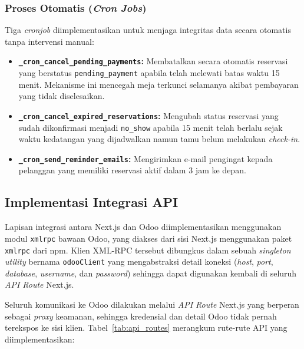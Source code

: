 \documentclass[conference]{IEEEtran}
\begin{document}
\subsubsection{Proses Otomatis (\textit{Cron Jobs})}
Tiga \textit{cronjob} diimplementasikan untuk menjaga integritas data secara otomatis tanpa intervensi manual:
\begin{itemize}
    \item \textbf{\texttt{\_cron\_cancel\_pending\_payments}:} Membatalkan secara otomatis reservasi yang berstatus \texttt{pending\_payment} apabila telah melewati batas waktu 15 menit. Mekanisme ini mencegah meja terkunci selamanya akibat pembayaran yang tidak diselesaikan.
    \item \textbf{\texttt{\_cron\_cancel\_expired\_reservations}:} Mengubah status reservasi yang sudah dikonfirmasi menjadi \texttt{no\_show} apabila 15 menit telah berlalu sejak waktu kedatangan yang dijadwalkan namun tamu belum melakukan \textit{check-in}.
    \item \textbf{\texttt{\_cron\_send\_reminder\_emails}:} Mengirimkan e-mail pengingat kepada pelanggan yang memiliki reservasi aktif dalam 3 jam ke depan.
\end{itemize}

\subsection{Implementasi Integrasi API}
Lapisan integrasi antara Next.js dan Odoo diimplementasikan menggunakan modul \texttt{xmlrpc} bawaan Odoo, yang diakses dari sisi Next.js menggunakan paket \texttt{xmlrpc} dari npm. Klien XML-RPC tersebut dibungkus dalam sebuah \textit{singleton utility} bernama \texttt{odooClient} yang mengabstraksi detail koneksi (\textit{host}, \textit{port}, \textit{database}, \textit{username}, dan \textit{password}) sehingga dapat digunakan kembali di seluruh \textit{API Route} Next.js.

Seluruh komunikasi ke Odoo dilakukan melalui \textit{API Route} Next.js yang berperan sebagai \textit{proxy} keamanan, sehingga kredensial dan detail Odoo tidak pernah terekspos ke sisi klien. Tabel~\ref{tab:api_routes} merangkum rute-rute API yang diimplementasikan:
\end{document}
